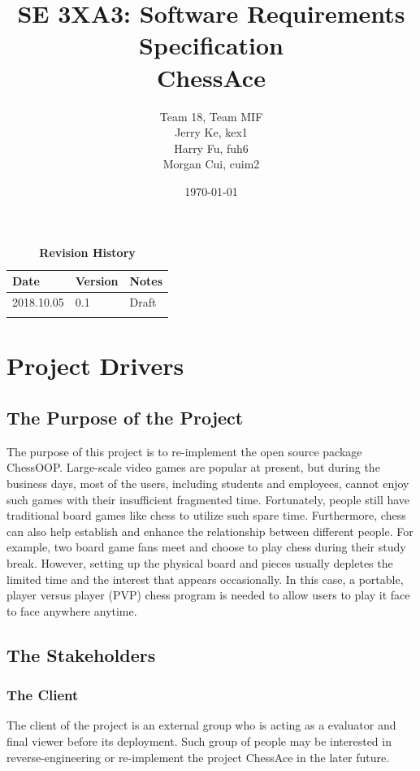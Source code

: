 \documentclass[12pt, titlepage]{article}
\title{SE 3XA3: Software Requirements Specification\\ChessAce}
\author{Team 18, Team MIF
		\\ Jerry Ke,  kex1
		\\ Harry Fu, fuh6
		\\ Morgan Cui, cuim2
}
\date{\today}
\begin{document}
\maketitle

\tableofcontents
\listoftables
\listoffigures

\begin{table}[bp]
\caption{\bf Revision History}
\begin{tabularx}{\textwidth}{p{3cm}p{2cm}X}
\toprule {\bf Date} & {\bf Version} & {\bf Notes}\\
\midrule
2018.10.05 & 0.1 & Draft\\
\color{red}{2018.11.23} & \color{red}{1.0} & \color{red}{Functional Requirement Revised}\\
\bottomrule
\end{tabularx}
\end{table}

\newpage


\section{Project Drivers}

\subsection{The Purpose of the Project}
The purpose of this project is to re-implement the open source package ChessOOP. Large-scale video games are popular at present, but during the business days, most of the users, including students and employees, cannot enjoy such games with their insufficient fragmented time. Fortunately, people still have traditional board games like chess to utilize such spare time. Furthermore, chess can also help establish and enhance the relationship between different people. For example, two board game fans meet and choose to play chess during their study break. However, setting up the physical board and pieces usually depletes the limited time and the interest that appears occasionally. In this case, a portable, player versus player (PVP) chess program is needed to allow users to play it face to face anywhere anytime.

\subsection{The Stakeholders}

\subsubsection{The Client}
The client of the project is an external group who is acting as a evaluator and final viewer before its deployment. Such group of people may be interested in reverse-engineering or re-implement the project ChessAce in the later future.
\end{document}

